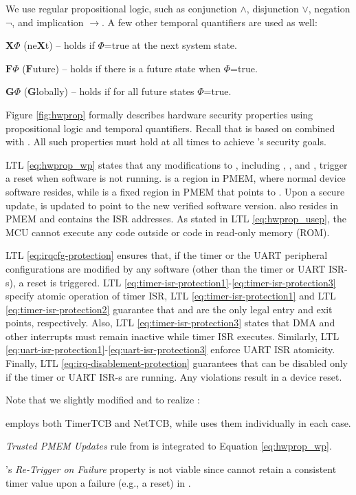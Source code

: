 We use regular propositional logic, such as conjunction $\land$, disjunction $\lor$, 
negation $\neg$, and implication $\rightarrow$. A few other temporal quantifiers are used as well:
%
\begin{compactitem}
    \item $\textbf{X} \Phi$ (ne$\textbf{X}$t) -- holds if $\Phi$=true at the next system state.
    \item $\textbf{F} \Phi$ ($\textbf{F}$uture) -- holds if there is a future state when $\Phi$=true.
    \item $\textbf{G} \Phi$ ($\textbf{G}$lobally) -- holds if for all future states $\Phi$=true.
\end{compactitem}
%
Figure \ref{fig:hwprop} formally describes \trapscasu hardware security properties using 
propositional logic and temporal quantifiers. Recall that \trapscasu is based on \casu 
combined with \garota. All such properties must hold at all times to achieve \trapscasu's
security goals.

LTL \ref{eq:hwprop_wp} states that any modifications to \casumem, including \er, \ep, and \ivtr, 
trigger a reset when \trapscasu software is not running. \er is a region in PMEM, where normal 
device software resides, while \ep is a fixed region in PMEM that points to \er.
Upon a secure update, \ep is updated to point to the new verified software version.
\ivtr also resides in PMEM and contains the ISR addresses.
As stated in LTL \ref{eq:hwprop_usep}, the MCU cannot execute any code outside \er 
or \trapscasu code in read-only memory (ROM).

LTL \ref{eq:irqcfg-protection} ensures that, if the timer or the UART peripheral configurations
are modified by any software (other than the timer or UART ISR-s), a reset is triggered.
LTL \ref{eq:timer-isr-protection1}-\ref{eq:timer-isr-protection3} specify atomic operation of 
timer ISR, LTL \ref{eq:timer-isr-protection1} and LTL \ref{eq:timer-isr-protection2} guarantee 
that \isrtmin and \isrtmax are the only legal entry and exit points, respectively.
Also, LTL \ref{eq:timer-isr-protection3} states that DMA and other interrupts must remain 
inactive while timer ISR executes. Similarly, LTL 
\ref{eq:uart-isr-protection1}-\ref{eq:uart-isr-protection3} enforce UART ISR atomicity.
Finally, LTL \ref{eq:irq-disablement-protection} guarantees that \gie can be disabled 
only if the timer or UART ISR-s are running. Any violations result in a device reset.

Note that we slightly modified \casu and \garota to realize \trapscasu:
\begin{compactenum}
    \item \trapscasu employs both TimerTCB and NetTCB, while \garota uses them individually in each case.
    \item {\it Trusted PMEM Updates} rule from \garota is integrated to Equation \ref{eq:hwprop_wp}.
    \item \garota's {\it Re-Trigger on Failure} property is not viable 
    since \trapscasu cannot retain a consistent timer value upon a failure (e.g., a reset) in \trapsnortc. 
\end{compactenum}

